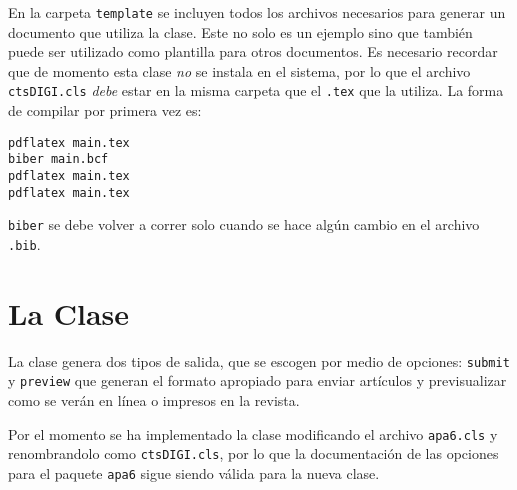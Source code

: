 \documentclass{article}
\begin{document}
En la carpeta \texttt{template} se incluyen todos los archivos necesarios para generar un documento que utiliza la clase. Este no solo es un ejemplo sino que también puede ser utilizado como plantilla para otros documentos. Es necesario recordar que de momento esta clase \emph{no} se instala en el sistema, por lo que el archivo \texttt{ctsDIGI.cls} \emph{debe} estar en la misma carpeta que el \texttt{.tex} que la utiliza. La forma de compilar por primera vez es:
\begin{verbatim}
pdflatex main.tex
biber main.bcf
pdflatex main.tex
pdflatex main.tex
\end{verbatim}
\texttt{biber} se debe volver a correr solo cuando se hace algún cambio en el archivo \texttt{.bib}.

\section{La Clase}
La clase genera dos tipos de salida, que se escogen por medio de opciones: \texttt{submit} y \texttt{preview} que generan el formato apropiado para enviar artículos y previsualizar como se verán en línea o impresos en la revista.

Por el momento se ha implementado la clase modificando el archivo \texttt{apa6.cls} y renombrandolo como \texttt{ctsDIGI.cls}, por lo que la documentación de las opciones para el paquete \texttt{apa6} sigue siendo válida para la nueva clase.
\end{document}
